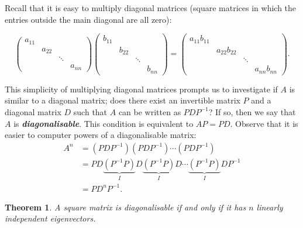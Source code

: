 \documentclass[a4paper]{article}
\theoremstyle{plain}
\newtheorem{theorem}{Theorem}[section]
\theoremstyle{definition}
\begin{document}
Recall that it is easy to multiply diagonal matrices (square matrices in which the entries outside the main diagonal
are all zero):

\[
	\begin{pmatrix}
		a_{11} &        &        &        \\
		       & a_{22} &        &        \\
		       &        & \ddots &        \\
		       &        &        & a_{nn}
	\end{pmatrix}
	\begin{pmatrix}
		b_{11} &        &        &        \\
		       & b_{22} &        &        \\
		       &        & \ddots &        \\
		       &        &        & b_{nn}
	\end{pmatrix}
	=
	\begin{pmatrix}
		a_{11}b_{11} &              &        &              \\
		             & a_{22}b_{22} &        &              \\
		             &              & \ddots &              \\
		             &              &        & a_{nn}b_{nn}
	\end{pmatrix}.
\]

This simplicity of multiplying diagonal matrices prompts us to investigate if $A$ is similar to a diagonal matrix; does
there exist an invertible matrix $P$ and a diagonal matrix $D$ such that $A$ can be written as $PDP^{-1}$? If so, then
we say that $A$ is \textbf{\textit{diagonalisable}}. This condition is equivalent to $AP=PD$. Observe that it is easier
to computer powers of a diagonalisable matrix:
\begin{align*}
	A^n & = (PDP^{-1})(PDP^{-1})\cdots(PDP^{-1})                                                             \\
	    & = PD\underbrace{(P^{-1}P)}_{I}D\underbrace{(P^{-1}P)}_{I}D\cdots \underbrace{(P^{-1}P)}_{I}DP^{-1} \\
	    & = PD^n P^{-1}.
\end{align*}

\begin{theorem}
	\label{thrm:1}
	A square matrix is diagonalisable if and only if it has $n$ linearly independent eigenvectors.
\end{theorem}
\end{document}

